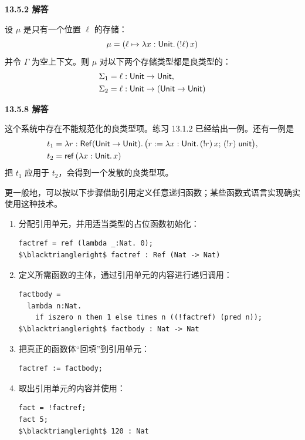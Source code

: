 \begin{taplauthorsolutionentrybox}
\label{sol:author:13.5.2}
\textbf{13.5.2 解答}

设 \(\mu\) 是只有一个位置 \(\ell\) 的存储：
\[
  \mu=(\ell\mapsto\lambda x:\mathsf{Unit}.\,(!\ell)\,x)
\]
并令 \(\Gamma\) 为空上下文。则 \(\mu\) 对以下两个存储类型都是良类型的：
\[
\begin{aligned}
\Sigma_1&=\ell:\mathsf{Unit}\to\mathsf{Unit},\\
\Sigma_2&=\ell:\mathsf{Unit}\to
  (\mathsf{Unit}\to\mathsf{Unit})
\end{aligned}
\]

\end{taplauthorsolutionentrybox}

\begin{taplauthorsolutionentrybox}
\label{sol:author:13.5.8}
\textbf{13.5.8 解答}

这个系统中存在不能规范化的良类型项。练习 13.1.2 已经给出一例。还有一例是
\[
\begin{aligned}
t_1={}&\lambda r:\mathsf{Ref}
  (\mathsf{Unit}\to\mathsf{Unit}).\,
  \bigl(r:=\lambda x:\mathsf{Unit}.\,(!r)\,x;\,(!r)\;\mathsf{unit}\bigr),\\
t_2={}&\mathsf{ref}\,(\lambda x:\mathsf{Unit}.\,x)
\end{aligned}
\]
把 \(t_1\) 应用于 \(t_2\)，会得到一个发散的良类型项。

更一般地，可以按以下步骤借助引用定义任意递归函数；某些函数式语言实现确实
使用这种技术。

\begin{enumerate}
  \item 分配引用单元，并用适当类型的占位函数初始化：
    \begin{lstlisting}[mathescape=true]
factref = ref (lambda _:Nat. 0);
$\blacktriangleright$ factref : Ref (Nat -> Nat)
    \end{lstlisting}

  \item 定义所需函数的主体，通过引用单元的内容进行递归调用：
    \begin{lstlisting}[mathescape=true]
factbody =
  lambda n:Nat.
    if iszero n then 1 else times n ((!factref) (pred n));
$\blacktriangleright$ factbody : Nat -> Nat
    \end{lstlisting}

  \item 把真正的函数体“回填”到引用单元：
    \begin{lstlisting}
factref := factbody;
    \end{lstlisting}

  \item 取出引用单元的内容并使用：
    \begin{lstlisting}[mathescape=true]
fact = !factref;
fact 5;
$\blacktriangleright$ 120 : Nat
    \end{lstlisting}
\end{enumerate}

\end{taplauthorsolutionentrybox}
